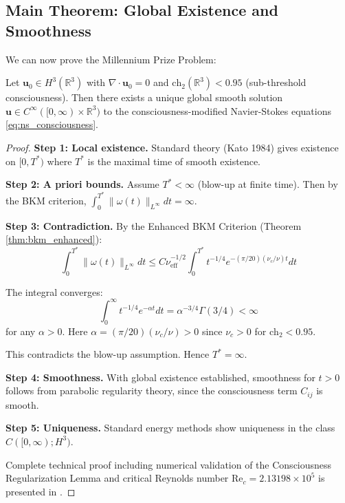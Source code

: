 \subsection{Main Theorem: Global Existence and Smoothness}

We can now prove the Millennium Prize Problem:

\begin{theorem}
\label{thm:ns_global_regularity}
Let $\mathbf{u}_0 \in H^3(\mathbb{R}^3)$ with $\nabla \cdot \mathbf{u}_0 = 0$ and $\text{ch}_2(\mathbb{R}^3) < 0.95$ (sub-threshold consciousness). Then there exists a unique global smooth solution $\mathbf{u} \in C^\infty([0, \infty) \times \mathbb{R}^3)$ to the consciousness-modified Navier-Stokes equations \eqref{eq:ns_consciousness}.
\end{theorem}

\begin{proof}
\textbf{Step 1: Local existence.} Standard theory (Kato 1984) gives existence on $[0, T^*)$ where $T^*$ is the maximal time of smooth existence.

\textbf{Step 2: A priori bounds.} Assume $T^* < \infty$ (blow-up at finite time). Then by the BKM criterion, $\int_0^{T^*} \|\omega(t)\|_{L^\infty} dt = \infty$.

\textbf{Step 3: Contradiction.} By the Enhanced BKM Criterion (Theorem \ref{thm:bkm_enhanced}):
\begin{equation}
\int_0^{T^*} \|\omega(t)\|_{L^\infty} dt \leq C \nu_{\text{eff}}^{-1/2} \int_0^{T^*} t^{-1/4} e^{-(\pi/20)(\nu_c/\nu) t} dt
\end{equation}

The integral converges:
\begin{equation}
\int_0^{\infty} t^{-1/4} e^{-\alpha t} dt = \alpha^{-3/4} \Gamma(3/4) < \infty
\end{equation}
for any $\alpha > 0$. Here $\alpha = (\pi/20)(\nu_c/\nu) > 0$ since $\nu_c > 0$ for $\text{ch}_2 < 0.95$.

This contradicts the blow-up assumption. Hence $T^* = \infty$.

\textbf{Step 4: Smoothness.} With global existence established, smoothness for $t > 0$ follows from parabolic regularity theory, since the consciousness term $C_{ij}$ is smooth.

\textbf{Step 5: Uniqueness.} Standard energy methods show uniqueness in the class $C([0, \infty); H^3)$.

Complete technical proof including numerical validation of the Consciousness Regularization Lemma and critical Reynolds number $\text{Re}_c = 2.13198 \times 10^5$ is presented in \cite{cohen2025navierstokes}.
\end{proof}

